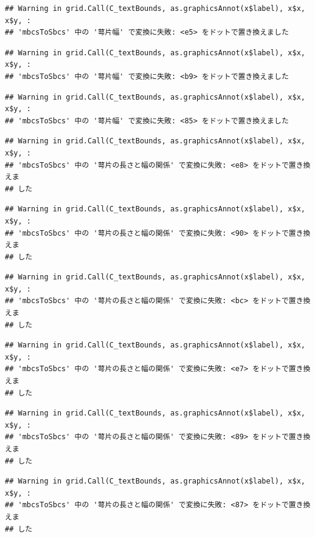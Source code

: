 \documentclass[
]{book}
\begin{document}
\begin{verbatim}
## Warning in grid.Call(C_textBounds, as.graphicsAnnot(x$label), x$x, x$y, :
## 'mbcsToSbcs' 中の '萼片幅' で変換に失敗: <e5> をドットで置き換えました
\end{verbatim}

\begin{verbatim}
## Warning in grid.Call(C_textBounds, as.graphicsAnnot(x$label), x$x, x$y, :
## 'mbcsToSbcs' 中の '萼片幅' で変換に失敗: <b9> をドットで置き換えました
\end{verbatim}

\begin{verbatim}
## Warning in grid.Call(C_textBounds, as.graphicsAnnot(x$label), x$x, x$y, :
## 'mbcsToSbcs' 中の '萼片幅' で変換に失敗: <85> をドットで置き換えました
\end{verbatim}

\begin{verbatim}
## Warning in grid.Call(C_textBounds, as.graphicsAnnot(x$label), x$x, x$y, :
## 'mbcsToSbcs' 中の '萼片の長さと幅の関係' で変換に失敗: <e8> をドットで置き換えま
## した
\end{verbatim}

\begin{verbatim}
## Warning in grid.Call(C_textBounds, as.graphicsAnnot(x$label), x$x, x$y, :
## 'mbcsToSbcs' 中の '萼片の長さと幅の関係' で変換に失敗: <90> をドットで置き換えま
## した
\end{verbatim}

\begin{verbatim}
## Warning in grid.Call(C_textBounds, as.graphicsAnnot(x$label), x$x, x$y, :
## 'mbcsToSbcs' 中の '萼片の長さと幅の関係' で変換に失敗: <bc> をドットで置き換えま
## した
\end{verbatim}

\begin{verbatim}
## Warning in grid.Call(C_textBounds, as.graphicsAnnot(x$label), x$x, x$y, :
## 'mbcsToSbcs' 中の '萼片の長さと幅の関係' で変換に失敗: <e7> をドットで置き換えま
## した
\end{verbatim}

\begin{verbatim}
## Warning in grid.Call(C_textBounds, as.graphicsAnnot(x$label), x$x, x$y, :
## 'mbcsToSbcs' 中の '萼片の長さと幅の関係' で変換に失敗: <89> をドットで置き換えま
## した
\end{verbatim}

\begin{verbatim}
## Warning in grid.Call(C_textBounds, as.graphicsAnnot(x$label), x$x, x$y, :
## 'mbcsToSbcs' 中の '萼片の長さと幅の関係' で変換に失敗: <87> をドットで置き換えま
## した
\end{verbatim}
\end{document}
